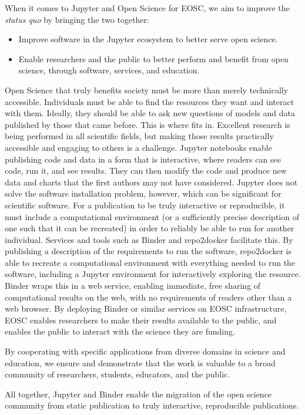 When it comes to Jupyter and Open Science for EOSC, we aim to improve the
\textit{status quo} by bringing the two together:

\begin{itemize}
\item Improve software in the Jupyter ecosystem to better serve open
  science.
\item Enable researchers and the public to better perform and benefit
  from open science, through software, services, and education.
\end{itemize}

Open Science that truly benefits society must be more than merely
technically accessible.  Individuals must be able to find the
resources they want and interact with them.  Ideally, they should be
able to ask new questions of models and data published by those that
came before.  This is where \TheProject fits in.  Excellent research
is being performed in all scientific fields, but making those results
practically accessible and engaging to others is a challenge.
Jupyter notebooks enable publishing code and data in a form that is
interactive, where readers can see code, run it, and see results.
They can then modify the code and produce new data and charts that the
first authors may not have considered.  Jupyter does not solve the
software installation problem, however, which can be significant for
scientific software.  For a publication to be truly interactive or
reproducible, it must include a computational environment (or a
sufficiently precise description of one such that it can be recreated)
in order to reliably be able to run for another individual.  Services
and tools such as Binder and repo2docker facilitate this.  By
publishing a description of the requirements to run the software,
repo2docker is able to recreate a computational environment with
everything needed to run the software, including a Jupyter
environment for interactively exploring the resource.  Binder wraps
this in a web service, enabling immediate, free sharing of
computational results on the web, with no requirements of readers
other than a web browser.  By deploying Binder or similar services on
EOSC infrastructure, EOSC enables researchers to make their results
available to the public, and enables the public to interact with the
science they are funding.

By cooperating with specific applications from diverse domains in science and education,
we ensure and demonstrate that the work is valuable to a broad community of researchers, students, educators, and the public.

All together, Jupyter and Binder enable the migration of the open
science community from static publication to truly interactive,
reproducible publications.



